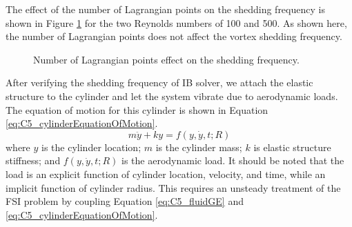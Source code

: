 %
The effect of the number of Lagrangian points on the shedding frequency is shown in Figure \ref{fig:C5_numberOfLagrangianOnSheddingFreq} for the two Reynolds numbers of 100 and 500. As shown here, the number of Lagrangian points does not affect the vortex shedding frequency.
%
\begin{figure}[H]
    \centering
    \quad
    \caption{Number of Lagrangian points effect on the shedding frequency.}
    \label{fig:C5_numberOfLagrangianOnSheddingFreq}
\end{figure}
%
After verifying the shedding frequency of IB solver, we attach the elastic structure to the cylinder and let the system vibrate due to aerodynamic loads. The equation of motion for this cylinder is shown in Equation \eqref{eq:C5_cylinderEquationOfMotion}.
%
\begin{equation}\label{eq:C5_cylinderEquationOfMotion}
	m \ddot{y} + k y = f(y, \dot{y}, t; R)
\end{equation}
%
where $y$ is the cylinder location; $m$ is the cylinder mass; $k$ is elastic structure stiffness; and $f(y, \dot{y}, t; R)$ is the aerodynamic load. It should be noted that the load is an explicit function of cylinder location, velocity, and time, while an implicit function of cylinder radius. This requires an unsteady treatment of the FSI problem by coupling Equation \eqref{eq:C5_fluidGE} and \eqref{eq:C5_cylinderEquationOfMotion}.

